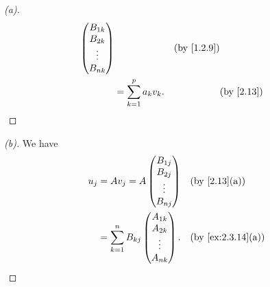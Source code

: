 \begin{proof}[(a)]
\begin{align*}
{\begin{pmatrix}
                                                                     B_{1 k} \\
                                                                     B_{2 k} \\
                                                                     \vdots  \\
                                                                     B_{n k}
                                                                   \end{pmatrix}} &  & \text{(by \cref{1.2.9})} \\
       & = \sum_{k = 1}^p a_k v_k.                              &  & \text{(by \cref{2.13})}
  \end{align*}
\end{proof}

\begin{proof}[(b)]
  We have
  \begin{align*}
    u_j & = A v_j = A \begin{pmatrix}
                        B_{1 j} \\
                        B_{2 j} \\
                        \vdots  \\
                        B_{n j}
                      \end{pmatrix}              &  & \text{(by \cref{2.13}(a))}       \\
        & = \sum_{k = 1}^n B_{k j} \begin{pmatrix}
                                     A_{1 k} \\
                                     A_{2 k} \\
                                     \vdots  \\
                                     A_{n k}
                                   \end{pmatrix}. &  & \text{(by \cref{ex:2.3.14}(a))}
  \end{align*}
\end{proof}

